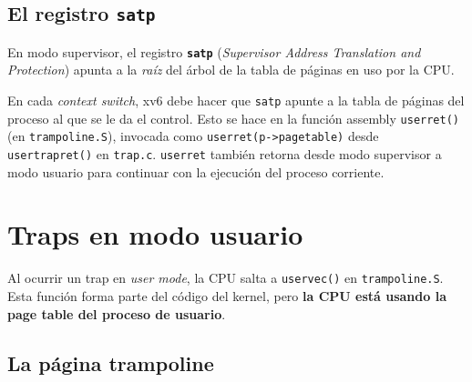 \documentclass[11pt,a4paper]{article}
\begin{document}
\subsection{El registro \texttt{satp}}

En modo supervisor, el registro \textbf{\texttt{satp}} (\emph{Supervisor
Address Translation and Protection}) apunta a la \emph{raíz} del árbol
de la tabla de páginas en uso por la CPU.

\begin{importante}
En cada \emph{context switch}, xv6 debe hacer que \texttt{satp}
apunte a la tabla de páginas del proceso al que se le da el control.
Esto se hace en la función assembly \texttt{userret()} (en
\texttt{trampoline.S}), invocada como \verb|userret(p->pagetable)|
desde \texttt{usertrapret()} en \texttt{trap.c}. \texttt{userret}
también retorna desde modo supervisor a modo usuario para continuar
con la ejecución del proceso corriente.
\end{importante}

\section{Traps en modo usuario}

Al ocurrir un trap en \emph{user mode}, la CPU salta a
\texttt{uservec()} en \texttt{trampoline.S}. Esta función forma parte
del código del kernel, pero \textbf{la CPU está usando la page table
del proceso de usuario}.

\subsection{La página trampoline}

\begin{center}
\end{center}
\end{document}
